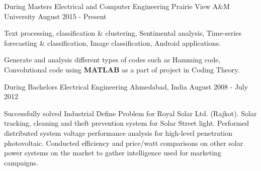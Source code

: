 \begin{cventries}
	\cventry
	{During Masters} %
	{Electrical and Computer Engineering} %
	{Prairie View A\&M University} %
	{August 2015 - Present} %
	{ %
		\begin{cvitems}
			\item {Text processing, classification \& clustering, Sentimental analysis, Time-series forecasting \& classification, Image classification, Android applications. } %
			\item {Generate and analysis different types of codes such as Hamming code, Convolutional code using \textbf{MATLAB} as a part of project in Coding Theory.}
		\end{cvitems}
	}
	\cventry
	{During Bachelors} %
	{Electrical Engineering} %
	{Ahmedabad, India} %
	{August 2008 - July 2012} %
	{ %
		\begin{cvitems}
			\item {Successfully solved Industrial Define Problem for Royal Solar Ltd. (Rajkot). Solar tracking, cleaning and theft prevention system for Solar Street light. Performed distributed system voltage performance analysis for high-level penetration photovoltaic. Conducted efficiency and price/watt comparisons on other solar power systems on the market to gather intelligence used for marketing campaigns.}
		\end{cvitems}
	}
\end{cventries}